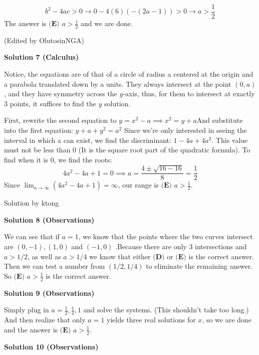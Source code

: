 \begin{enumerate}
 
 \[b^2 - 4ac > 0 \rightarrow 0 - 4(6)(-(2a - 1)) > 0 \rightarrow a > \frac{1}{2}\]The answer is $\boxed{\textbf{(E) }a>\frac12}$ and we are done. 

 (Edited by OlutosinNGA)

 



\textbf{Solution 7 (Calculus)}

Notice, the equations are of that of a circle of radius a centered at the origin and a parabola translated down by a units. They always intersect at the point $(0, a)$, and they have symmetry across the $y$-axis, thus, for them to intersect at exactly $3$ points, it suffices to find the $y$ solution. 

 First, rewrite the second equation to $y=x^2-a\implies x^2=y+a$And substitute into the first equation: $y+a+y^2=a^2$ Since we're only interested in seeing the interval in which a can exist, we find the discriminant: $1-4a+4a^2$. This value must not be less than $0$ (It is the square root part of the quadratic formula). To find when it is $0$, we find the roots: 
 \[4a^2-4a+1=0 \implies a=\frac{4\pm\sqrt{16-16}}{8}=\frac{1}{2}\]Since $\lim_{a\to \infty}(4a^2-4a+1)=\infty$, our range is $\boxed{\textbf{(E) }a>\frac12}$.

 Solution by ktong

 



\textbf{Solution 8 (Observations)}

We can see that if $a = 1$, we know that the points where the two curves intersect are $(0, -1), (1, 0)$ and $(-1, 0)$ .Because there are only $3$ intersections and $a > 1/2$, as well as $a > 1/4$ we know that either $\textbf{(D)}$ or $\textbf{(E)}$ is the correct answer. Then we can test a number from $(1/2, 1/4)$ to eliminate the remaining answer. So  $\boxed{\textbf{(E) }a>\frac12}$ is the correct answer. 

 



\textbf{Solution 9 (Observations)}

Simply plug in $a = \frac{1}{2}, \frac{1}{4}, 1$ and solve the systems. (This shouldn't take too long.) And then realize that only $a=1$ yields three real solutions for $x$, so we are done and the answer is $\boxed{\textbf{(E) }a>\frac12}$.

 



\textbf{Solution 10 (Observations)}


\end{enumerate}

